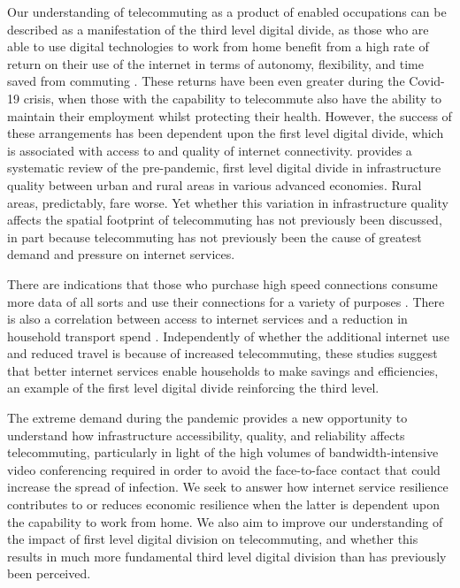 \documentclass[Royal,times,sageh]{sagej}
\begin{document}
Our understanding of telecommuting as a product of enabled occupations
can be described as a manifestation of the third level digital divide,
as those who are able to use digital technologies to work from home
benefit from a high rate of return on their use of the internet in terms
of autonomy, flexibility, and time saved from commuting
\citep{peters2004employees, siha2006telecommuting, singh2013modeling}.
These returns have been even greater during the Covid-19 crisis, when
those with the capability to telecommute also have the ability to
maintain their employment whilst protecting their health. However, the
success of these arrangements has been dependent upon the first level
digital divide, which is associated with access to and quality of
internet connectivity. \citet{SALEMINK2017360} provides a systematic
review of the pre-pandemic, first level digital divide in infrastructure
quality between urban and rural areas in various advanced economies.
Rural areas, predictably, fare worse. Yet whether this variation in
infrastructure quality affects the spatial footprint of telecommuting
has not previously been discussed, in part because telecommuting has not
previously been the cause of greatest demand and pressure on internet
services.

There are indications that those who purchase high speed connections
consume more data of all sorts and use their connections for a variety
of purposes \citep{hauge2011consumer}. There is also a correlation
between access to internet services and a reduction in household
transport spend \citep{bris2017ict}. Independently of whether the
additional internet use and reduced travel is because of increased
telecommuting, these studies suggest that better internet services
enable households to make savings and efficiencies, an example of the
first level digital divide reinforcing the third level.

The extreme demand during the pandemic provides a new opportunity to
understand how infrastructure accessibility, quality, and reliability
affects telecommuting, particularly in light of the high volumes of
bandwidth-intensive video conferencing required in order to avoid the
face-to-face contact that could increase the spread of infection. We
seek to answer how internet service resilience contributes to or reduces
economic resilience when the latter is dependent upon the capability to
work from home. We also aim to improve our understanding of the impact
of first level digital division on telecommuting, and whether this
results in much more fundamental third level digital division than has
previously been perceived.
\end{document}
